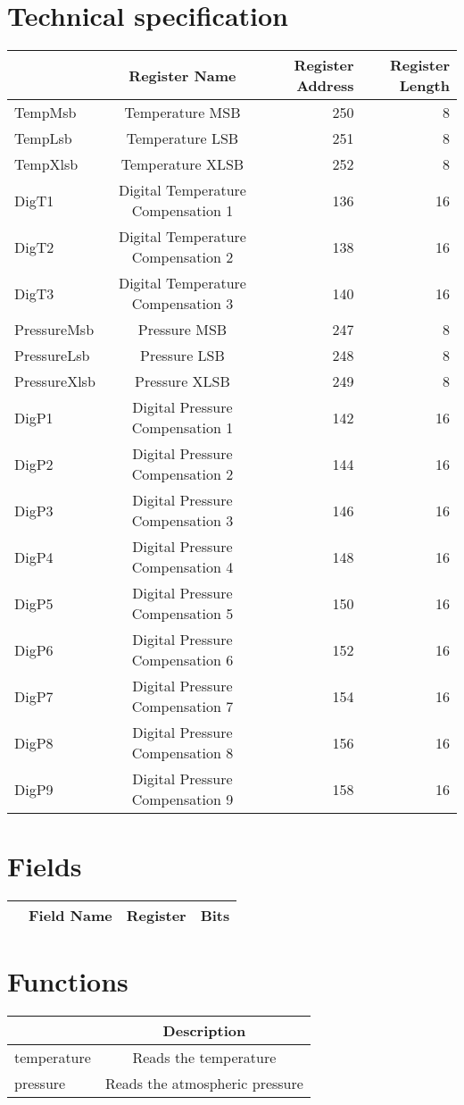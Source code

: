 \documentclass[a4paper,12pt,oneside,pdflatex,italian,final,twocolumn]{article}
\begin{document}
\section{Technical specification}
\centering
\begin{tabular}{lcrr}
\toprule
 & Register Name & Register Address & Register Length \\
\midrule
TempMsb & Temperature MSB & 250 & 8 \\
TempLsb & Temperature LSB & 251 & 8 \\
TempXlsb & Temperature XLSB & 252 & 8 \\
DigT1 & Digital Temperature Compensation 1 & 136 & 16 \\
DigT2 & Digital Temperature Compensation 2 & 138 & 16 \\
DigT3 & Digital Temperature Compensation 3 & 140 & 16 \\
PressureMsb & Pressure MSB & 247 & 8 \\
PressureLsb & Pressure LSB & 248 & 8 \\
PressureXlsb & Pressure XLSB & 249 & 8 \\
DigP1 & Digital Pressure Compensation 1 & 142 & 16 \\
DigP2 & Digital Pressure Compensation 2 & 144 & 16 \\
DigP3 & Digital Pressure Compensation 3 & 146 & 16 \\
DigP4 & Digital Pressure Compensation 4 & 148 & 16 \\
DigP5 & Digital Pressure Compensation 5 & 150 & 16 \\
DigP6 & Digital Pressure Compensation 6 & 152 & 16 \\
DigP7 & Digital Pressure Compensation 7 & 154 & 16 \\
DigP8 & Digital Pressure Compensation 8 & 156 & 16 \\
DigP9 & Digital Pressure Compensation 9 & 158 & 16 \\
\bottomrule
\end{tabular}

\raggedright

\section{Fields}

\centering
\begin{tabular}{lcrr}
\toprule
  & Field Name & Register & Bits \\
\midrule
\bottomrule
\end{tabular}

\raggedright

\section{Functions}

\centering
\begin{tabular}{lc}
\toprule
  & Description \\
\midrule
temperature & Reads the temperature \\
pressure & Reads the atmospheric pressure \\
\bottomrule
\end{tabular}
\end{document}
